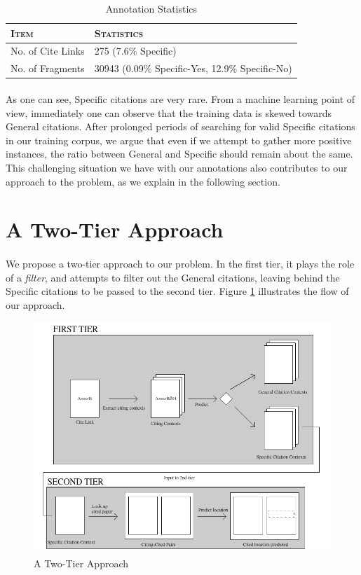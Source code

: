 \begin{table}[h]
	\center
	\begin{tabular}{ l | l}
		\textsc{Item} & \textsc{Statistics}\\
		\hline
		No. of Cite Links & 275 (7.6\% Specific) \\
		No. of Fragments & 30943 (0.09\% Specific-Yes, 12.9\% Specific-No)
	\end{tabular}
	\caption{Annotation Statistics}
	\label{tab:annotation}
\end{table}

\paragraph{}
As one can see, Specific citations are very rare. From a machine learning point of view, immediately one can observe that the training data is skewed towards General citations. After prolonged periods of searching for valid Specific citations in our training corpus, we argue that even if we attempt to gather more positive instances, the ratio between General and Specific should remain about the same. This challenging situation we have with our annotations also contributes to our approach to the problem, as we explain in the following section.

\section{A Two-Tier Approach}
\label{twotierapproach}
\paragraph{}
We propose a two-tier approach to our problem. In the first tier, it plays the role of a \textit{filter}, and attempts to filter out the General citations, leaving behind the Specific citations to be passed to the second tier. Figure \ref{fig:twotier} illustrates the flow of our approach.
\begin{figure}[h]
  \centering
  \includegraphics[scale=0.60]{./twotier}
  \caption{A Two-Tier Approach}
  \label{fig:twotier}
\end{figure}

